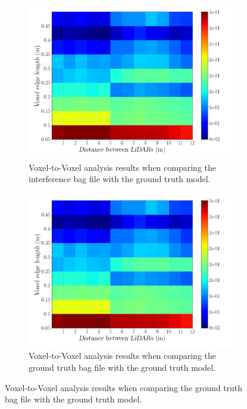 \begin{figure}[!ht]
\centering
\begin{subfigure}[c]{0.45\textwidth}
	\includegraphics[width=\textwidth]{img/lidar-interference/distance/octree_interference_color_mesh.png}
	\caption{Voxel-to-Voxel analysis results when comparing the interference bag file with the ground truth model.}
	\label{fig:distance:octree-interference-color-mesh}
\end{subfigure}
\qquad
\begin{subfigure}[c]{0.45\textwidth}
	\includegraphics[width=\textwidth]{img/lidar-interference/distance/octree_ground_truth_color_mesh.png}
	\caption{Voxel-to-Voxel analysis results when comparing the ground truth bag file with the ground truth model.}

\end{subfigure}
\end{figure}
